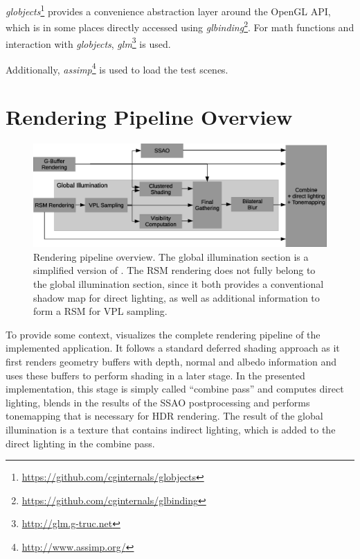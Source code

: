 \textit{globjects}\footnote{\url{https://github.com/cginternals/globjects}} provides a convenience abstraction layer around the OpenGL API, which is in some places directly accessed using \textit{glbinding}\footnote{\url{https://github.com/cginternals/glbinding}}. For math functions and interaction with \textit{globjects}, \textit{glm}\footnote{\url{http://glm.g-truc.net}} is used.

Additionally, \textit{assimp}\footnote{\url{http://www.assimp.org/}} is used to load the test scenes.


\section{Rendering Pipeline Overview}

\begin{figure}[h]
    \includegraphics[width=\textwidth]{graphics/Rendering_pipeline_rough}
    \caption{Rendering pipeline overview. The global illumination section is a simplified version of . The RSM rendering does not fully belong to the global illumination section, since it both provides a conventional shadow map for direct lighting, as well as additional information to form a RSM for VPL sampling.}
    \label{fig:RenderingPipelineOverview}
\end{figure}


To provide some context,  visualizes the complete rendering pipeline of the implemented application. It follows a standard deferred shading approach as it first renders geometry buffers with depth, normal and albedo information and uses these buffers to perform shading in a later stage. In the presented implementation, this stage is simply called ``combine pass'' and computes direct lighting, blends in the results of the SSAO postprocessing and performs tonemapping that is necessary for HDR rendering. The result of the global illumination is a texture that contains indirect lighting, which is added to the direct lighting in the combine pass.

